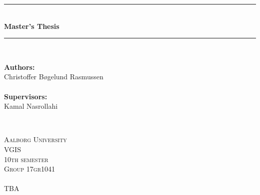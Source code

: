 \begin{titlepage}

\newcommand{\HRule}{\rule{\linewidth}{0.5mm}} %

\center %


\HRule \\[0.5cm]
{\LARGE \bfseries 
Master's Thesis
}\\[0.3cm]
\HRule \\[0.5cm]


\null
\vfill%

\begin{minipage}[b]{0.4\textwidth}
\begin{flushleft} \large
\textbf{Authors:}\\
Christoffer Bøgelund Rasmussen\\
\emph{ }\\
\textbf{Supervisors:}\\
Kamal Nasrollahi\\
\end{flushleft}
\end{minipage}
~
\begin{minipage}[b]{0.4\textwidth}
\begin{flushright} \large
\textsc{\large Aalborg University}\\
\textsc{\large VGIS}\\ 
\textsc{\large 10th semester}\\
\textsc{\large Group 17gr1041}\\
\emph{ }\\
\textsc{\small TBA}\\
\end{flushright}
\end{minipage}

\end{titlepage}
